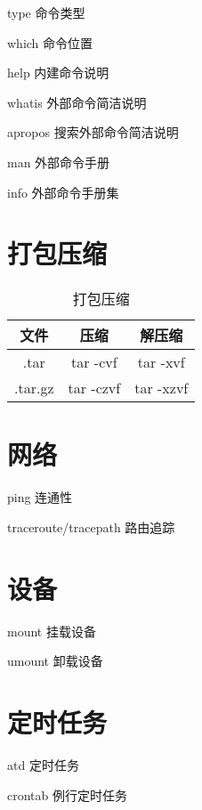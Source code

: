 \documentclass[12pt]{ctexart}
\theoremstyle{definition}
\begin{document}
    type 命令类型

    which 命令位置

    help 内建命令说明

    whatis 外部命令简洁说明

    apropos 搜索外部命令简洁说明

    man 外部命令手册

    info 外部命令手册集

    \section{打包压缩}

    \begin{table}[htbp]
        \centering
        \begin{tabular}{|c|c|c}
            \hline
            文件 & 压缩 & 解压缩\\
            \hline
            .tar & tar -cvf & tar -xvf\\
            \hline
            .tar.gz & tar -czvf & tar -xzvf\\
            \hline
        \end{tabular}
        \caption{打包压缩}
    \end{table}

    \section{网络}

    ping 连通性

    traceroute/tracepath 路由追踪

    \section{设备}

    mount 挂载设备

    umount 卸载设备

    \section{定时任务}

    atd 定时任务

    crontab 例行定时任务
\end{document}
